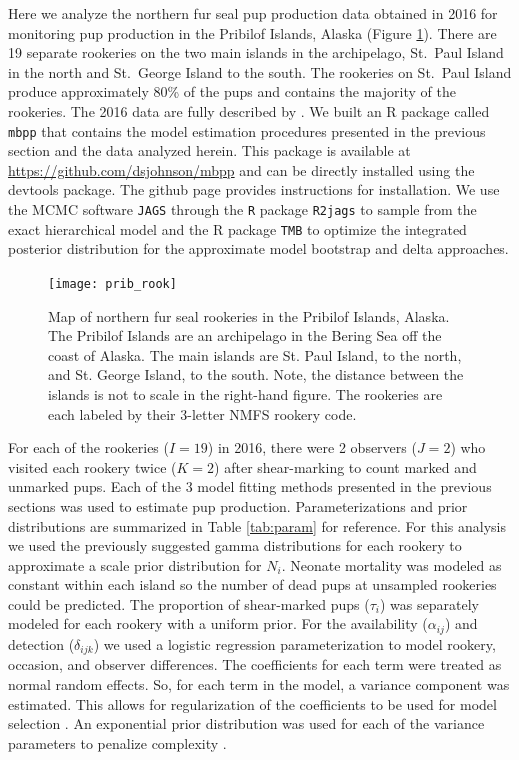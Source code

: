 \documentclass[fleqn,10pt]{wlscirep}
\begin{document}
{Here we analyze the northern fur seal pup production data obtained in 2016 for monitoring pup production in the Pribilof Islands, Alaska (Figure \ref{fig:rook}). There are 19 separate rookeries on the two main islands in the archipelago, St.~Paul Island in the north and St.~George Island to the south. The rookeries on St.~Paul Island produce approximately 80\% of the pups and contains the majority of the rookeries. The 2016 data are fully described by \cite{Testa:2018aa}. We built an R \cite{rcite} package called \texttt{mbpp} that contains the model estimation procedures presented in the previous section and the data analyzed herein. This package is available at \url{https://github.com/dsjohnson/mbpp} and can be directly installed using the devtools package. The github page provides instructions for installation. We use the MCMC software \texttt{JAGS} \cite{plummer2003jags} through the \texttt{R} package \texttt{R2jags} \cite{Su:2015aa} to sample from the exact hierarchical model and the R package \texttt{TMB} \cite{kristensen2016tmb} to optimize the integrated posterior distribution for the approximate model bootstrap and delta approaches.

\begin{figure}[t]

{\centering \texttt{[image: prib\_rook]} 

}

\caption{Map of northern fur seal rookeries in the Pribilof Islands, Alaska. The Pribilof Islands are an archipelago in the Bering Sea off the coast of Alaska. The main islands are St. Paul Island, to the north, and St. George Island, to the south. Note, the distance between the islands is not to scale in the right-hand figure. The rookeries are each labeled by their 3-letter NMFS rookery code.}\label{fig:rook}
\end{figure}

For each of the rookeries (\(I=19\)) in 2016, there were 2 observers (\(J=2\)) who visited each rookery twice (\(K=2\)) after shear-marking to count marked and unmarked pups. Each of the 3 model fitting methods presented in the previous sections was used to estimate pup production. Parameterizations and prior distributions are summarized in Table \ref{tab:param} for reference. For this analysis we used the previously suggested gamma distributions for each rookery to approximate a scale prior distribution for \(N_i\). Neonate mortality was modeled as constant within each island so the number of dead pups at unsampled rookeries could be predicted. The proportion of shear-marked pups (\(\tau_i\)) was separately modeled for each rookery with a uniform prior. For the availability (\(\alpha_{ij}\)) and detection (\(\delta_{ijk}\)) we used a logistic regression parameterization to model rookery, occasion, and observer differences. The coefficients for each term were treated as normal random effects. So, for each term in the model, a variance component was estimated. This allows for regularization of the coefficients to be used for model selection \cite{hooten2015guide}. An exponential prior distribution was used for each of the variance parameters to penalize complexity \cite{martins2017penalising}.

}
\end{document}
